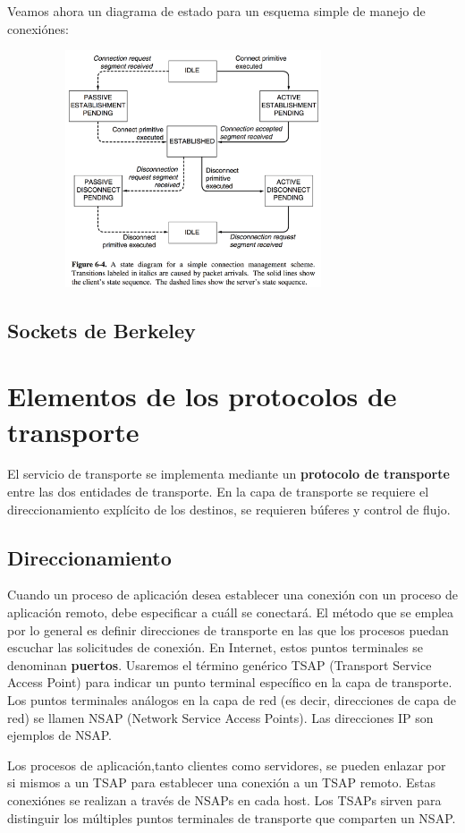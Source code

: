 \documentclass[10pt,a4paper]{report}
\begin{document}
\par Veamos ahora un diagrama de estado para un esquema simple de manejo de 
conexiónes:

\begin{center}
	\includegraphics[width=11cm, height=7cm]{./imagenes/diagrama.png} 
\end{center}

\subsection{Sockets de Berkeley}


\section{Elementos de los protocolos de transporte}
\par El servicio de transporte se implementa mediante un \textbf{protocolo de 
transporte} entre las dos entidades de transporte. En la capa de transporte se requiere 
el direccionamiento explícito de los destinos, se requieren búferes y control de flujo.

\subsection{Direccionamiento}
\par Cuando un proceso de aplicación desea establecer una conexión con un proceso 
de aplicación remoto, debe especificar a cuáll se conectará. El método que se emplea 
por lo general es definir direcciones de transporte en las que los procesos puedan 
escuchar las solicitudes de conexión. En Internet, estos puntos terminales se 
denominan \textbf{puertos}. Usaremos el término genérico TSAP (Transport Service 
Access Point) para indicar un punto terminal específico en la capa de transporte. Los 
puntos terminales análogos en la capa de red (es decir, direcciones de capa de red) se 
llamen NSAP (Network Service Access Points). Las direcciones IP son ejemplos de 
NSAP.
\par Los procesos de aplicación,tanto clientes como servidores, se pueden enlazar por 
si mismos a un TSAP para establecer una conexión a un TSAP remoto. Estas 
conexiónes se realizan a través de NSAPs en cada host. Los TSAPs sirven para 
distinguir los múltiples puntos terminales de transporte que comparten un NSAP.
\end{document}
